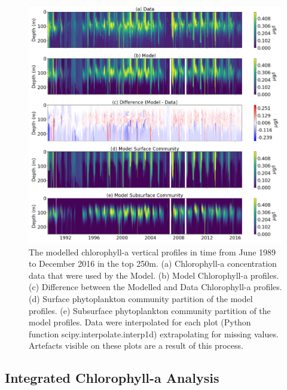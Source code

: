 \documentclass{article}
\begin{document}
\begin{figure}[ht!]
\begin{center}
      \includegraphics[height=0.945\textwidth]{model_contour.PNG}
\end{center}
\caption{The modelled chlorophyll-a vertical profiles in time from June 1989 to December 2016 in the top 250m. (a) Chlorophyll-a concentration data that were used by the Model. (b) Model Chlorophyll-a profiles. (c) Difference between the Modelled and Data Chlorophyll-a profiles. (d) Surface phytoplankton community partition of the model profiles. (e) Subsurface phytoplankton community partition of the model profiles. Data were interpolated for each plot (Python function scipy.interpolate.interp1d) extrapolating for missing values. Artefacts visible on these plots are a result of this process. }
\end{figure}
\subsection{Integrated Chlorophyll-a Analysis}
\end{document}
